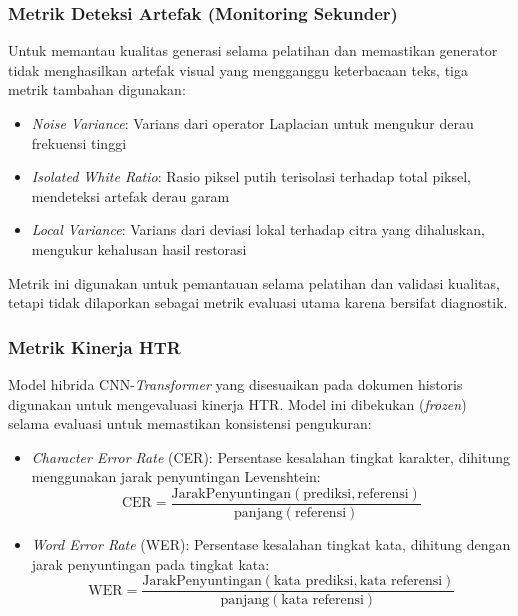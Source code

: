 \documentclass[journal]{IEEEtran}
\begin{document}
\subsubsection{Metrik Deteksi Artefak (Monitoring Sekunder)}

Untuk memantau kualitas generasi selama pelatihan dan memastikan generator tidak menghasilkan artefak visual yang mengganggu keterbacaan teks, tiga metrik tambahan digunakan:

\begin{itemize}
    \item \textit{Noise Variance}: Varians dari operator Laplacian untuk mengukur derau frekuensi tinggi
    
    \item \textit{Isolated White Ratio}: Rasio piksel putih terisolasi terhadap total piksel, mendeteksi artefak derau garam
    
    \item \textit{Local Variance}: Varians dari deviasi lokal terhadap citra yang dihaluskan, mengukur kehalusan hasil restorasi
\end{itemize}

Metrik ini digunakan untuk pemantauan selama pelatihan dan validasi kualitas, tetapi tidak dilaporkan sebagai metrik evaluasi utama karena bersifat diagnostik.

\subsubsection{Metrik Kinerja HTR}

Model hibrida CNN-\textit{Transformer} yang disesuaikan pada dokumen historis digunakan untuk mengevaluasi kinerja HTR. Model ini dibekukan (\textit{frozen}) selama evaluasi untuk memastikan konsistensi pengukuran:

\begin{itemize}
    \item \textit{Character Error Rate} (CER): Persentase kesalahan tingkat karakter, dihitung menggunakan jarak penyuntingan Levenshtein:
    \begin{equation}
    \text{CER} = \frac{\text{JarakPenyuntingan}(\text{prediksi}, \text{referensi})}{\text{panjang}(\text{referensi})}
    \end{equation}
    
    \item \textit{Word Error Rate} (WER): Persentase kesalahan tingkat kata, dihitung dengan jarak penyuntingan pada tingkat kata:
    \begin{equation}
    \text{WER} = \frac{\text{JarakPenyuntingan}(\text{kata prediksi}, \text{kata referensi})}{\text{panjang}(\text{kata referensi})}
    \end{equation}
\end{itemize}
\end{document}
